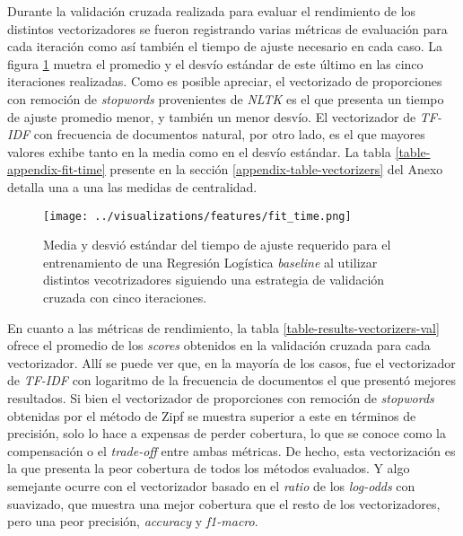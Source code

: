 Durante la validaci\'on cruzada realizada para evaluar el rendimiento de los
distintos vectorizadores se fueron registrando varias m\'etricas de evaluaci\'on
para cada iteraci\'on como as\'i tambi\'en el tiempo de ajuste necesario en cada caso.
La figura \ref{fig-results-features-fit-time} muetra el promedio y el desv\'io
est\'andar de este \'ultimo en las cinco iteraciones realizadas. Como es posible
apreciar, el vectorizado de proporciones con remoci\'on de \textit{stopwords}
provenientes de \textit{NLTK} es el que presenta un tiempo de ajuste promedio
menor, y tambi\'en un menor desv\'io. El vectorizador de \textit{TF-IDF} con
frecuencia de documentos natural, por otro lado, es el que mayores valores
exhibe tanto en la media como en el desv\'io est\'andar. La tabla \ref{table-appendix-fit-time}
presente en la secci\'on \ref{appendix-table-vectorizers} del Anexo detalla una
a una las medidas de centralidad.

\begin{figure}[h!]
    \centering
    \texttt{[image: ../visualizations/features/fit\_time.png]}
    \caption{Media y desvi\'o est\'andar del tiempo de ajuste requerido
    para el entrenamiento de una Regresi\'on Log\'istica \textit{baseline}
    al utilizar distintos vecotrizadores siguiendo una estrategia de
    validaci\'on cruzada con cinco iteraciones.}
    \label{fig-results-features-fit-time}
\end{figure}

En cuanto a las m\'etricas de rendimiento,
la tabla \ref{table-results-vectorizers-val} ofrece el promedio de los \textit{scores}
obtenidos en la validaci\'on cruzada para cada vectorizador. All\'i se puede ver que,
en la mayor\'ia de los casos, fue el vectorizador de \textit{TF-IDF} con logaritmo
de la frecuencia de documentos el que present\'o mejores resultados. Si bien el
vectorizador de proporciones con remoci\'on de \textit{stopwords} obtenidas por el
m\'etodo de Zipf se muestra superior a este en t\'erminos de precisi\'on, solo
lo hace a expensas de perder cobertura, lo que se conoce como la compensaci\'on o el
\textit{trade-off} entre ambas m\'etricas. De hecho, esta vectorizaci\'on es la que
presenta la peor cobertura de todos los m\'etodos evaluados. Y algo semejante ocurre
con el vectorizador basado en el \textit{ratio} de los \textit{log-odds} con
suavizado, que
muestra una mejor cobertura que el resto de los vectorizadores, pero una peor
precisi\'on, \textit{accuracy} y \textit{f1-macro}.

